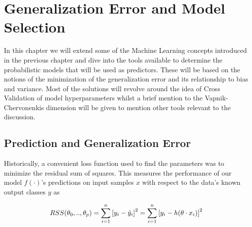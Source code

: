 
\chapter{Generalization Error and Model Selection }\label{ch:modelSelection}


In this chapter we will extend some of the Machine Learning concepts introduced in the previous chapter and dive into the tools available to determine the probabilistic models that will be used as predictors.
These will be based on the notions of the minimization of the generalization error and its relationship to bias and variance.
Most of the solutions will revolve around the idea of Cross Validation of model hyperparameters whilst a brief mention to the Vapnik-Chervonenkis dimension will be given to mention other tools relevant to the discussion.


\section{Prediction and Generalization Error}\label{subsection-generalizationError}

Historically, a convenient loss function used to find the parameters was to minimize the residual sum of squares.
This measures the performance of our model $f(\cdot)$'s predictions on input samples $x$ with respect to the data's known output classes $y$ as

\begin{equation}
RSS(\theta_0,..,\theta_p) = \sum_{i=1}^n {[y_i - \hat{y}_i ] }^2 \\
= \sum_{i=1}^n  {[y_i - h( \theta \cdot x_i)] }^2
\label{eq:rss}
\end{equation}


